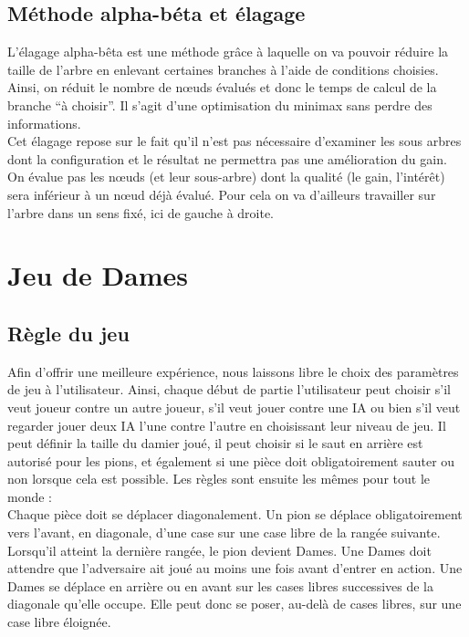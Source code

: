 \documentclass[12,french]{report}
\begin{document}
\section{Méthode alpha-béta et élagage}

L'élagage alpha-bêta est une méthode grâce à laquelle on
va pouvoir réduire la taille de l'arbre en enlevant certaines branches
à l'aide de conditions choisies. Ainsi, on réduit le nombre de nœuds
évalués et donc le temps de calcul de la branche ``à choisir''.
Il s'agit d'une optimisation du minimax sans perdre des informations. \\

Cet élagage repose sur le fait qu'il n'est pas nécessaire d'examiner
les sous arbres dont la configuration et le résultat ne permettra
pas une amélioration du gain. On évalue pas les nœuds (et leur sous-arbre)
dont la qualité (le gain, l'intérêt) sera inférieur à un nœud déjà
évalué. Pour cela on va d'ailleurs travailler sur l'arbre dans un
sens fixé, ici de gauche à droite. 


\chapter{Jeu de Dames}

\section{Règle du jeu}

Afin d'offrir une meilleure expérience, nous laissons libre le choix des paramètres de jeu à l'utilisateur. Ainsi, chaque début de partie l'utilisateur peut choisir s'il veut joueur contre un autre joueur, s'il veut jouer contre une IA ou bien s'il veut regarder jouer deux IA l'une contre l'autre en choisissant leur niveau de jeu. Il peut définir la taille du damier joué, il peut choisir si le saut en arrière est autorisé pour les pions, et également si une pièce doit obligatoirement sauter ou non lorsque cela est possible. Les règles sont ensuite les mêmes pour tout le monde :\\

Chaque pièce doit se déplacer diagonalement. Un pion se déplace obligatoirement vers l’avant, en diagonale, d’une case sur une case libre de la rangée suivante. Lorsqu'il atteint la dernière rangée, le pion devient Dames. Une Dames doit attendre que l’adversaire ait joué au moins une fois avant d’entrer en action. Une Dames se déplace en arrière ou en avant sur les cases libres successives de la diagonale qu’elle occupe. Elle peut donc se poser, au-delà de cases libres, sur une case libre éloignée.\\
\end{document}
